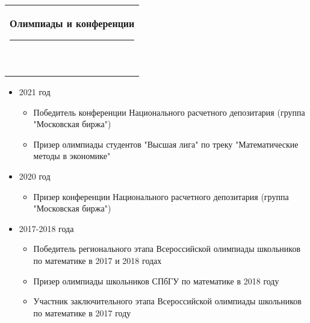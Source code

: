\documentclass[10pt,A4,english]{article}
\newcommand{\mpwidth}{\linewidth-\fboxsep-\fboxsep}
\newcommand{\cvtext}[1] {
	\begin{tabular*}{1\mpwidth}{p{0.98\mpwidth}}
		\parbox{1\mpwidth}{#1}
	\end{tabular*}
}
\newcommand{\cvsection}[1] {
	\vspace{14pt}
	\cvtext{
		\textbf{\LARGE{\textcolor{darkcol}{#1}}}\\[-4pt]
		\textcolor{accentcol}{ \rule{0.2\textwidth}{1.5pt} } \\
	}
}
\begin{document}
\begin{paracol}{2}
\begin{rightcolumn}
\vspace{-0.3cm}

\cvsection{Олимпиады и конференции}
\begin{itemize}
\item 2021 год

\begin{itemize}
    \item Победитель конференции Национального расчетного депозитария (группа "Московская биржа")
    \item Призер олимпиады студентов "Высшая лига" по треку "Математические методы в экономике"
\end{itemize}
\vspace{-0.3cm}
\item 2020 год
\begin{itemize}
    \item Призер конференции Национального расчетного депозитария (группа "Московская биржа")
\end{itemize}
\item 2017-2018 года
\begin{itemize}
    \item Победитель регионального этапа Всероссийской олимпиады школьников по математике в 2017 и 2018 годах
    \item Призер олимпиады школьников СПбГУ по математике в 2018 году
    \item Участник заключительного этапа Всероссийской олимпиады школьников по математике в 2017 году
    \end{itemize}
\end{itemize}

\mbox{}
\vfill
\mbox{}
\vfill
\mbox{}
\vfill
\mbox{}
\vfill
\mbox{}
\vfill
\mbox{}
\vfill
\mbox{}

\end{rightcolumn}
\end{paracol}
\end{document}
